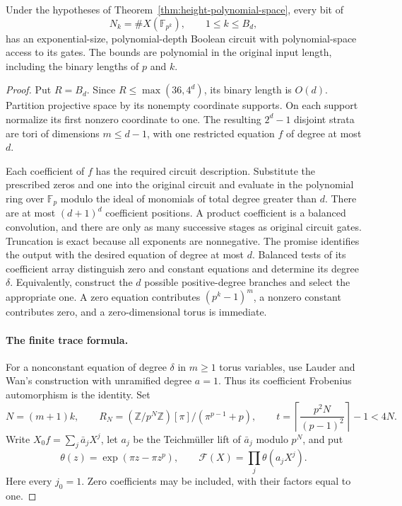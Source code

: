 \begin{lemma}
\label{lem:point-count-bits-space}
Under the hypotheses of Theorem~\ref{thm:height-polynomial-space}, every bit of
\[
 N_k=\#X(\mathbb F_{p^k}),\qquad 1\le k\le B_d,
\]
has an exponential-size, polynomial-depth Boolean circuit with polynomial-space access to its gates. The bounds are polynomial in the original input length, including the binary lengths of $p$ and $k$.
\end{lemma}
\begin{proof}
Put $R=B_d$. Since $R\le\max(36,4^d)$, its binary length is $O(d)$. Partition projective space by its nonempty coordinate supports. On each support normalize its first nonzero coordinate to one. The resulting $2^d-1$ disjoint strata are tori of dimensions $m\le d-1$, with one restricted equation $f$ of degree at most $d$.

Each coefficient of $f$ has the required circuit description. Substitute the prescribed zeros and one into the original circuit and evaluate in the polynomial ring over $\mathbb F_p$ modulo the ideal of monomials of total degree greater than $d$. There are at most $(d+1)^d$ coefficient positions. A product coefficient is a balanced convolution, and there are only as many successive stages as original circuit gates. Truncation is exact because all exponents are nonnegative. The promise identifies the output with the desired equation of degree at most $d$. Balanced tests of its coefficient array distinguish zero and constant equations and determine its degree $\delta$. Equivalently, construct the $d$ possible positive-degree branches and select the appropriate one. A zero equation contributes $(p^k-1)^m$, a nonzero constant contributes zero, and a zero-dimensional torus is immediate.

\paragraph{The finite trace formula.}
For a nonconstant equation of degree $\delta$ in $m\ge1$ torus variables, use Lauder and Wan's construction with unramified degree $a=1$. Thus its coefficient Frobenius automorphism is the identity. Set
\[
 N=(m+1)k,\qquad
 R_N=(\mathbb Z/p^N\mathbb Z)[\pi]/(\pi^{p-1}+p),\qquad
 t=\left\lceil\frac{p^2N}{(p-1)^2}\right\rceil-1<4N.
\]
Write $X_0f=\sum_j\bar a_jX^j$, let $a_j$ be the Teichm\"uller lift of $\bar a_j$ modulo $p^N$, and put
\[
 \theta(z)=\exp(\pi z-\pi z^p),\qquad
 \mathcal F(X)=\prod_j\theta(a_jX^j).
\]
Here every $j_0=1$. Zero coefficients may be included, with their factors equal to one.


\end{proof}
